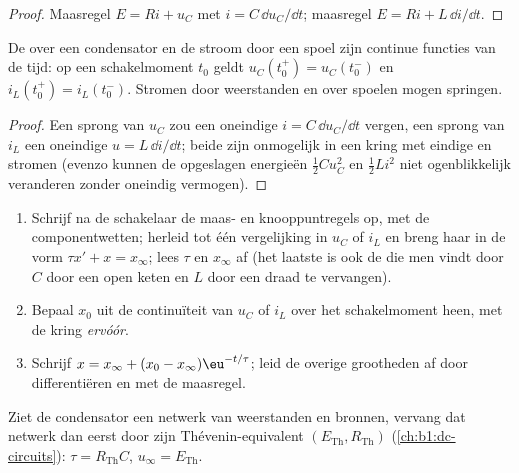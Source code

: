 \begin{proof}
Maasregel $E = Ri + u_C$ met $i = C\,\dd u_C/\dd t$; maasregel
$E = Ri + L\,\dd i/\dd t$.
\end{proof}

\begin{proposition}[Continuïteitsvoorwaarden]\label{prop:b1:transient-regimes:continuity}
De  over een condensator en de stroom door een spoel zijn
continue functies van de tijd: op een schakelmoment $t_0$ geldt
$u_C(t_0^+) = u_C(t_0^-)$ en $i_L(t_0^+) = i_L(t_0^-)$. Stromen door
weerstanden en  over spoelen mogen springen.
\end{proposition}

\begin{proof}
Een sprong van $u_C$ zou een oneindige $i = C\,\dd u_C/\dd t$ vergen, een sprong
van $i_L$ een oneindige $u = L\,\dd i/\dd t$; beide zijn
onmogelijk in een kring met eindige  en stromen (evenzo kunnen
de opgeslagen energieën $\tfrac12 Cu_C^2$ en $\tfrac12 Li^2$ niet
ogenblikkelijk veranderen zonder oneindig vermogen).
\end{proof}

\begin{method}\label{met:b1:transient-regimes:first}
\begin{enumerate}
  \item Schrijf na de schakelaar de maas- en knooppuntregels op, met de
        componentwetten; herleid tot één vergelijking in $u_C$ of $i_L$ en
        breng haar in de vorm $\tau x' + x = x_\infty$; lees $\tau$ en
        $x_\infty$ af (het laatste is ook de  die men vindt door
        $C$ door een open keten en $L$ door een draad te vervangen).
  \item Bepaal $x_0$ uit de continuïteit van $u_C$ of $i_L$ over het
        schakelmoment heen, met de kring \emph{ervóór}.
  \item Schrijf $x = x_\infty + (x_0 - x_\infty)\eu^{-t/\tau}$; leid
        de overige grootheden af door differentiëren en met de maasregel.
\end{enumerate}
Ziet de condensator een netwerk van weerstanden en bronnen, vervang dat
netwerk dan eerst door zijn Thévenin-equivalent $(E_{\mathrm{Th}}, R_{\mathrm{Th}})$
(\cref{ch:b1:dc-circuits}): $\tau = R_{\mathrm{Th}}C$,
$u_\infty = E_{\mathrm{Th}}$.
\end{method}

